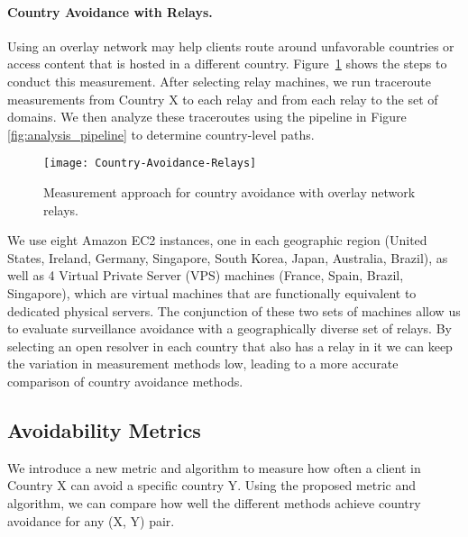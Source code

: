 \paragraph{Country Avoidance with Relays.} Using an overlay network may
help clients route around unfavorable countries or access content that
is hosted in a different country.  Figure~\ref{fig:avoidance_relays}
shows the steps to conduct this measurement. 
After selecting relay machines, we run traceroute measurements from
Country X to each relay and from each relay to the set of domains. We
then analyze these traceroutes using the pipeline in Figure
\ref{fig:analysis_pipeline} to determine country-level paths. 

\begin{figure}[t]
\centering
\texttt{[image: Country-Avoidance-Relays]}
\caption{Measurement approach for country avoidance with overlay network relays.}
\label{fig:avoidance_relays}
\end{figure}

We use eight Amazon EC2 instances, one in each geographic region (United States, Ireland, Germany, Singapore, South Korea, Japan, Australia, Brazil), as well as 4 Virtual Private Server (VPS) machines (France, Spain, Brazil, Singapore), which are virtual machines that are functionally equivalent to dedicated physical servers.  The conjunction of these two sets of machines allow us to evaluate surveillance avoidance with a geographically diverse set of relays. By selecting an open resolver in each country that also has a relay in it we can keep the variation in measurement methods low, leading to a more accurate comparison of country avoidance methods.

\subsection{Avoidability Metrics}
\label{metrics}

We introduce a new metric and algorithm to measure how often a client in
Country X can avoid a specific country Y.  Using the proposed metric
and algorithm, we can compare how well the different methods achieve
country avoidance for any (X, Y) pair.

